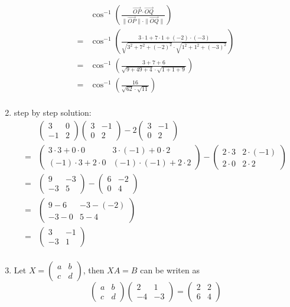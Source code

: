 \documentclass{article}
\newcommand*{\mat}[1]{\begin{pmatrix}#1\end{pmatrix}}
\begin{document}
\begin{enumerate}
{\begin{displaymath}
                \begin{aligned}
                    &\cos^{-1}\left(\frac{\vec{OP}\cdot\vec{OQ}}{\|\vec{OP}\|\cdot\|\vec{OQ}\|}\right) \\
                    = &\cos^{-1}\left(\frac{3\cdot1+7\cdot1+(-2)\cdot(-3)}{\sqrt{3^2+7^2+(-2)^2}\cdot\sqrt{1^2+1^2+(-3)^2}}\right) \\
                    = &\cos^{-1}\left(\frac{3+7+6}{\sqrt{9+49+4}\cdot\sqrt{1+1+9}}\right) \\
                    = &\cos^{-1}\left(\frac{16}{\sqrt{62}\cdot\sqrt{11}}\right) \\
                \end{aligned}
            \end{displaymath}
        }
        \item { step by step solution:
            \begin{displaymath}
                \begin{aligned}
                    &\mat{3 & 0 \\ -1 & 2}\mat{3 & -1 \\ 0 & 2} - 2\mat{3 & -1 \\ 0 & 2} \\
                    =&\mat{3\cdot3+0\cdot0 & 3\cdot(-1)+0\cdot2 \\ (-1)\cdot3+2\cdot0 & (-1)\cdot(-1)+2\cdot2} - \mat{2\cdot3 & 2\cdot(-1) \\ 2\cdot0 & 2\cdot2} \\
                    =&\mat{9 & -3 \\ -3 & 5} - \mat{6 & -2 \\ 0 & 4} \\
                    =&\mat{9 - 6 & -3 - (-2) \\ -3 - 0 & 5 - 4} \\
                    =&\mat{3 & -1 \\ -3 & 1} \\
                \end{aligned}
            \end{displaymath}
        }
        \item {
            Let \(X = \mat{a & b \\ c & d}\), then \(XA = B\) can be writen as
            \begin{displaymath}
                \mat{a & b \\ c & d}\mat{2 & 1 \\ -4 & -3} = \mat{2 & 2 \\ 6 & 4}

\end{displaymath}}
\end{enumerate}
\end{document}
